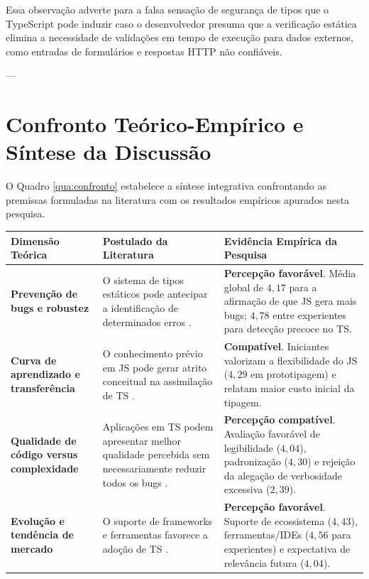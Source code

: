 Essa observação adverte para a falsa sensação de segurança de tipos que o TypeScript pode induzir caso o desenvolvedor presuma que a verificação estática elimina a necessidade de validações em tempo de execução para dados externos, como entradas de formulários e respostas HTTP não confiáveis.

---

\section{Confronto Teórico-Empírico e Síntese da Discussão}
\label{sec:sintese_discussao}

O Quadro \ref{qua:confronto} estabelece a síntese integrativa confrontando as premissas formuladas na literatura com os resultados empíricos apurados nesta pesquisa.

\begin{quadro}[H]
\centering
\caption{Confronto entre a literatura acadêmica e as evidências empíricas da pesquisa}
\label{qua:confronto}
\small
\begin{tabular}{|p{4.2cm}|p{5.0cm}|p{5.5cm}|}
\hline
\rowcolor{gray!20}
\textbf{Dimensão Teórica} & \textbf{Postulado da Literatura} & \textbf{Evidência Empírica da Pesquisa} \\
\hline
\textbf{Prevenção de bugs e robustez} & O sistema de tipos estáticos pode antecipar a identificação de determinados erros \cite{richards2017}. & \textbf{Percepção favorável}. Média global de $4,17$ para a afirmação de que JS gera mais bugs; $4,78$ entre experientes para detecção precoce no TS. \\
\hline
\textbf{Curva de aprendizado e transferência} & O conhecimento prévio em JS pode gerar atrito conceitual na assimilação de TS \cite{shrestha2022}. & \textbf{Compatível}. Iniciantes valorizam a flexibilidade do JS ($4,29$ em prototipagem) e relatam maior custo inicial da tipagem. \\
\hline
\textbf{Qualidade de código versus complexidade} & Aplicações em TS podem apresentar melhor qualidade percebida sem necessariamente reduzir todos os bugs \cite{bogner2022}. & \textbf{Percepção compatível}. Avaliação favorável de legibilidade ($4,04$), padronização ($4,30$) e rejeição da alegação de verbosidade excessiva ($2,39$). \\
\hline
\textbf{Evolução e tendência de mercado} & O suporte de frameworks e ferramentas favorece a adoção de TS \cite{george2020, stackoverflow2023}. & \textbf{Percepção favorável}. Suporte de ecossistema ($4,43$), ferramentas/IDEs ($4,56$ para experientes) e expectativa de relevância futura ($4,04$). \\
\hline
\end{tabular}
\vspace{0.1cm}

\end{quadro}

